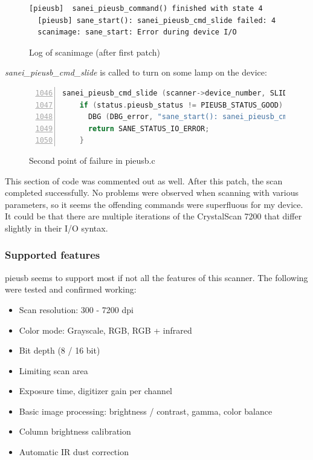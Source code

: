 \documentclass{article}
\begin{document}
\begin{figure}[H]
  \caption{Log of scanimage (after first patch)}
  \begin{lstlisting}[language={}]
  [pieusb] 	sanei_pieusb_command() finished with state 4
  [pieusb] sane_start(): sanei_pieusb_cmd_slide failed: 4
  scanimage: sane_start: Error during device I/O
  \end{lstlisting}
\end{figure}

{\it sanei\_pieusb\_cmd\_slide} is called to turn on some lamp on the device:

\begin{figure}[H]
  \caption{Second point of failure in pieusb.c}
  \begin{lstlisting}[language=C, breaklines=true, numbers=left, firstnumber=1046]
    sanei_pieusb_cmd_slide (scanner->device_number, SLIDE_LAMP_ON, &status);
    if (status.pieusb_status != PIEUSB_STATUS_GOOD) {
      DBG (DBG_error, "sane_start(): sanei_pieusb_cmd_slide failed: %d\n", status.pieusb_status);
      return SANE_STATUS_IO_ERROR;
    }
  \end{lstlisting}
\end{figure}

This section of code was commented out as well. After this patch, the scan
completed successfully. No problems were observed when scanning with various
parameters, so it seems the offending commands were superfluous for my device.
It could be that there are multiple iterations of the CrystalScan 7200 that differ
slightly in their I/O syntax.

\subsubsection{Supported features}

pieusb seems to support most if not all the features of this scanner.
The following were tested and confirmed working:

\begin{itemize}
  \item Scan resolution: 300 - 7200 dpi
  \item Color mode: Grayscale, RGB, RGB + infrared
  \item Bit depth (8 / 16 bit)
  \item Limiting scan area
  \item Exposure time, digitizer gain per channel
  \item Basic image processing: brightness / contrast, gamma, color balance
  \item Column brightness calibration
  \item Automatic IR dust correction
\end{itemize}
\end{document}
